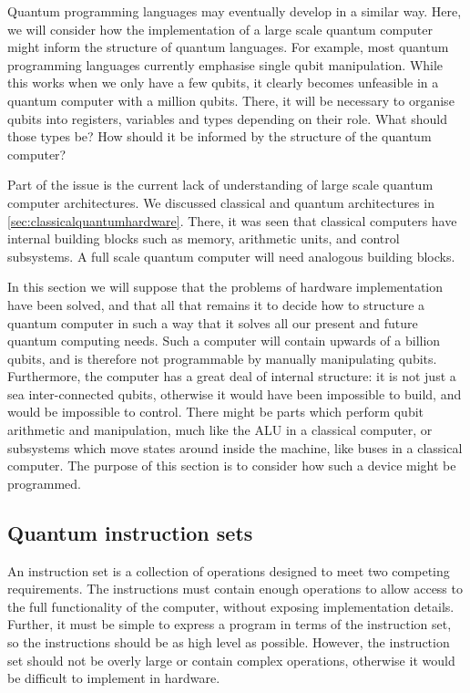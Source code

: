 Quantum programming languages may eventually develop in a similar way. Here, we will consider how the implementation of a large scale quantum computer might inform the structure of quantum languages. For example, most quantum programming languages currently emphasise single qubit manipulation. While this works when we only have a few qubits, it clearly becomes unfeasible in a quantum computer with a million qubits. There, it will be necessary to organise qubits into registers, variables and types depending on their role. What should those types be? How should it be informed by the structure of the quantum computer?

Part of the issue is the current lack of understanding of large scale quantum computer architectures. We discussed classical and quantum architectures in \autoref{sec:classicalquantumhardware}. There, it was seen that classical computers have internal building blocks such as memory, arithmetic units, and control subsystems. A full scale quantum computer will need analogous building blocks. 

In this section we will suppose that the problems of hardware implementation have been solved, and that all that remains it to decide how to structure a quantum computer in such a way that it solves all our present and future quantum computing needs. Such a computer will contain upwards of a billion qubits, and is therefore not programmable by manually manipulating qubits. Furthermore, the computer has a great deal of internal structure: it is not just a sea inter-connected qubits, otherwise it would have been impossible to build, and would be impossible to control. There might be parts which perform qubit arithmetic and manipulation, much like the ALU in a classical computer, or subsystems which move states around inside the machine, like buses in a classical computer. The purpose of this section is to consider how such a device might be programmed.

\subsection{Quantum instruction sets}
\label{sec:qinstructions}

An instruction set is a collection of operations designed to meet two competing requirements. The instructions must contain enough operations to allow access to the full functionality of the computer, without exposing implementation details. Further, it must be simple to express a program in terms of the instruction set, so the instructions should be as high level as possible. However, the instruction set should not be overly large or contain complex operations, otherwise it would be difficult to implement in hardware.

